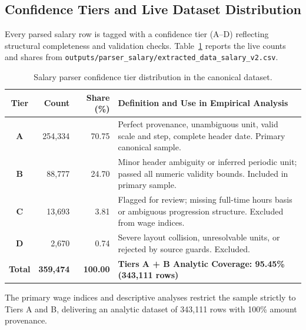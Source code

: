 \subsection{Confidence Tiers and Live Dataset Distribution}
\label{subsec:salary-tiers}

Every parsed salary row is tagged with a confidence tier (A--D) reflecting structural completeness and validation checks. Table~\ref{tab:salary-tiers} reports the live counts and shares from \nolinkurl{outputs/parser_salary/extracted_data_salary_v2.csv}.

\begin{table}[!htbp]
\centering
\small
\begin{tabularx}{\textwidth}{c r r X}
\toprule
\textbf{Tier} & \textbf{Count} & \textbf{Share (\%)} & \textbf{Definition and Use in Empirical Analysis} \\
\midrule
\textbf{A} & 254,334 & 70.75 & Perfect provenance, unambiguous unit, valid scale and step, complete header date. Primary canonical sample. \\
\textbf{B} & 88,777 & 24.70 & Minor header ambiguity or inferred periodic unit; passed all numeric validity bounds. Included in primary sample. \\
\textbf{C} & 13,693 & 3.81 & Flagged for review; missing full-time hours basis or ambiguous progression structure. Excluded from wage indices. \\
\textbf{D} & 2,670 & 0.74 & Severe layout collision, unresolvable units, or rejected by source guards. Excluded. \\
\midrule
\textbf{Total} & \textbf{359,474} & \textbf{100.00} & \textbf{Tiers A + B Analytic Coverage: 95.45\% (343,111 rows)} \\
\bottomrule
\end{tabularx}
\caption{Salary parser confidence tier distribution in the canonical dataset.}
\label{tab:salary-tiers}
\end{table}

The primary wage indices and descriptive analyses restrict the sample strictly to Tiers A and B, delivering an analytic dataset of 343,111 rows with 100\% amount provenance.

